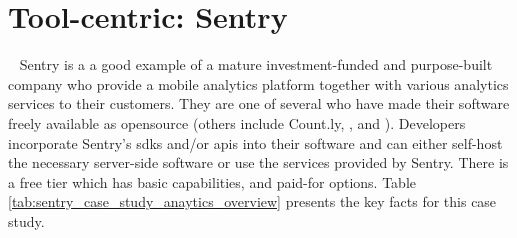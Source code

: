 

\section{Tool-centric: Sentry}~\label{case-study-overview-sentry}
Sentry is a a good example of a mature investment-funded and purpose-built company who provide a mobile analytics platform together with various analytics services to their customers. They are one of several who have made their software freely available as opensource (others include Count.ly, , and ). Developers incorporate Sentry's \Glspl{sdk} and/or \Glspl{api} into their software and can either self-host the necessary server-side software or use the services provided by Sentry. There is a free tier which has basic capabilities, and paid-for options. Table \ref{tab:sentry_case_study_anaytics_overview} presents the key facts for this case study.

